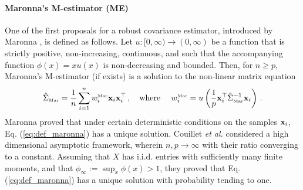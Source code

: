 \documentclass[times,sort&compress,3p]{elsarticle}
\begin{document}
\paragraph{Maronna's M-estimator (ME)} 
One of the first
proposals for a robust covariance estimator, introduced by Maronna  \cite{maronna1976robust}, is defined as follows.  
Let  $u:[0,\infty) \to (0,\infty)$ be a function that is strictly positive, non-increasing, continuous, and such that the accompanying function $\phi(x)=x u(x)$ is non-decreasing and bounded. 
Then, for $n\ge p$,  Maronna's M-estimator (if exists) is a solution to the non-linear matrix equation
\begin{equation}
\label{eq:def_maronna}
\hat{\Sigma}_{\mbox{\tiny{Mar}}} = \frac{1}{n}\sum_{i=1}^n w^{\mbox{\tiny{Mar}}}_i {\bf x}_i {\bf x}_i^{\top}\,,
\quad
\textrm{where }
\quad
w^{\mbox{\tiny{Mar}}}_i  = u \left( \frac{1}{p}{\bf x}_i^{\top} \hat{\Sigma}_{\mbox{\tiny{Mar}}}^{-1}{\bf x}_i \right) \,.
\end{equation}
Maronna \cite{maronna1976robust} proved that under certain deterministic conditions on the samples ${\bf x}_i$, 
Eq. (\ref{eq:def_maronna}) has
a unique solution. 
Couillet {\it et al.} \cite{couillet2014robust} considered a high dimensional asymptotic framework, wherein \(n,p\to\infty\) 
with their ratio converging to a constant.
Assuming that $X$ has i.i.d. entries with sufficiently many finite moments, and that $\phi_\infty:=\sup_{x}\phi(x)>1$,
they proved that
Eq. (\ref{eq:def_maronna})
has a unique solution with probability tending to one. 
\end{document}
